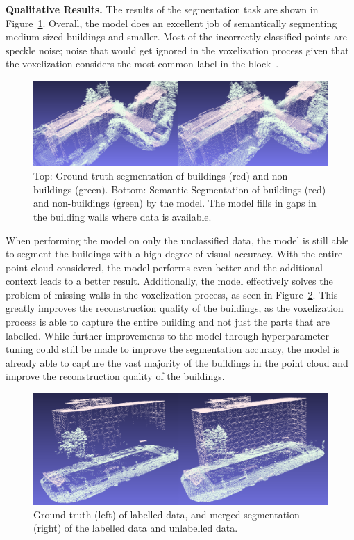 \documentclass[10pt,twocolumn,letterpaper]{article}
\begin{document}
    \textbf{Qualitative Results.} The results of the segmentation task are shown in Figure~\ref{fig:initial-segmentation-results}.
    Overall, the model does an excellent job of semantically segmenting medium-sized buildings and smaller. Most of the incorrectly classified points are speckle noise; noise that would get ignored in the voxelization process given that the voxelization considers the most common label in the block~\cite{MinecraftUBC}.
    

    \begin{figure}
        \centering
        \includegraphics[width=\linewidth]{initial_classification.png}
        \caption{Top: Ground truth segmentation of buildings (red) and non-buildings (green). Bottom: Semantic Segmentation of buildings (red) and non-buildings (green) by the model. The model fills in gaps in the building walls where data is available.}
        \label{fig:initial-segmentation-results}
    \end{figure}

    When performing the model on only the unclassified data, the model is still able to segment the buildings with a high degree of visual accuracy.
    With the entire point cloud considered, the model performs even better and the additional context leads to a better result.
    Additionally, the model effectively solves the problem of missing walls in the voxelization process, as seen in Figure~\ref{fig:full-segmentation-results}.
    This greatly improves the reconstruction quality of the buildings, as the voxelization process is able to capture the entire building and not just the parts that are labelled.
    While further improvements to the model through hyperparameter tuning could still be made to improve the segmentation accuracy, the model is already able to capture the vast majority of the buildings in the point cloud and improve the reconstruction quality of the buildings.

    \begin{figure}
        \centering
        \includegraphics[width=\linewidth]{orca_house.png}
        \caption{Ground truth (left) of labelled data, and merged segmentation (right) of the labelled data and unlabelled data.}
        \label{fig:full-segmentation-results}
    \end{figure}
\end{document}
